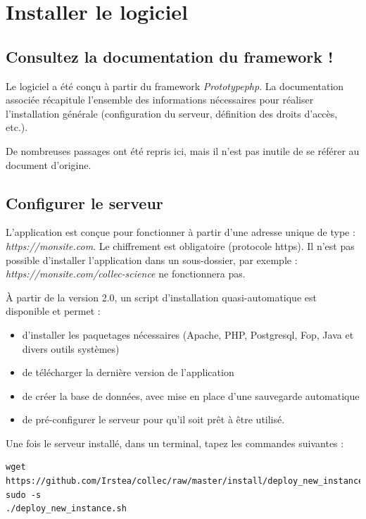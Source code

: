 \chapter{Installer le logiciel}

\section{Consultez la documentation du framework !}

Le logiciel a été conçu à partir du framework \textit{Prototypephp}. La documentation associée \cite{pphp-doc} récapitule l'ensemble des informations nécessaires pour réaliser l'installation générale (configuration du serveur, définition des droits d'accès, etc.).

De nombreuses passages ont été repris ici, mais il n'est pas inutile de se référer au document d'origine. 

\section{Configurer le serveur}

L'application est conçue pour fonctionner à partir d'une adresse unique de type : {\NoAutoSpacing\textit{https://monsite.com}}. Le chiffrement est obligatoire (protocole https). Il n'est pas possible d'installer l'application dans un sous-dossier, par exemple : {\NoAutoSpacing \textit{https://monsite.com/collec-science}} ne fonctionnera pas.

À partir de la version 2.0, un script d'installation quasi-automatique est disponible et permet :
\begin{itemize}
\item d'installer les paquetages nécessaires (Apache, PHP, Postgresql, Fop, Java et divers outils systèmes)
\item de télécharger la dernière version de l'application
\item de créer la base de données, avec mise en place d'une sauvegarde automatique
\item de pré-configurer le serveur pour qu'il soit prêt à être utilisé.
\end{itemize}

Une fois le serveur installé, dans un terminal, tapez les commandes suivantes :
\begin{lstlisting}
wget https://github.com/Irstea/collec/raw/master/install/deploy_new_instance.sh
sudo -s
./deploy_new_instance.sh
\end{lstlisting}

